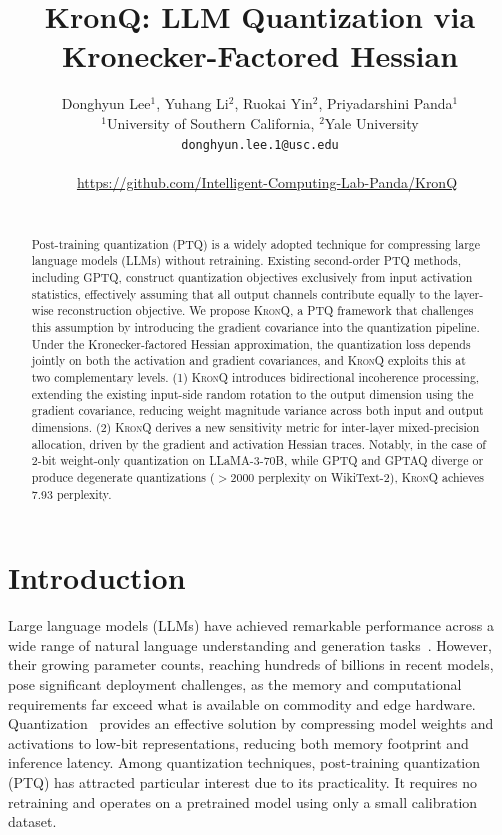 \documentclass{article} %
\title{KronQ: LLM Quantization via Kronecker-Factored Hessian}
\author{Donghyun Lee$^1$, Yuhang Li$^2$, Ruokai Yin$^2$, Priyadarshini Panda$^1$ \\
$^1$University of Southern California, $^2$Yale University\\
\texttt{donghyun.lee.1@usc.edu}\\[0.8em]
\centerline{\raisebox{-0.15em}{\large\faGithub}~~\url{https://github.com/Intelligent-Computing-Lab-Panda/KronQ}}\\
}
\newcommand{\KronQ}{\textsc{KronQ}}
\begin{document}
\ifcolmsubmission
\linenumbers
\fi

\maketitle

\begin{abstract}
\vspace{-3mm}
Post-training quantization (PTQ) is a widely adopted technique for compressing large language models (LLMs) without retraining. Existing second-order PTQ methods, including GPTQ, construct quantization objectives exclusively from input activation statistics, effectively assuming that all output channels contribute equally to the layer-wise reconstruction objective. We propose \KronQ{}, a PTQ framework that challenges this assumption by introducing the gradient covariance into the quantization pipeline. Under the Kronecker-factored Hessian approximation, the quantization loss depends jointly on both the activation and gradient covariances, and \KronQ{} exploits this at two complementary levels. (1) \KronQ{} introduces bidirectional incoherence processing, extending the existing input-side random rotation to the output dimension using the gradient covariance, reducing weight magnitude variance across both input and output dimensions. (2) \KronQ{} derives a new sensitivity metric for inter-layer mixed-precision allocation, driven by the gradient and activation Hessian traces. Notably, in the case of 2-bit weight-only quantization on LLaMA-3-70B, while GPTQ and GPTAQ diverge or produce degenerate quantizations ($>$2000 perplexity on WikiText-2), \KronQ{} achieves 7.93 perplexity.
\end{abstract}


\section{Introduction}
\vspace{-3mm}
Large language models (LLMs) have achieved remarkable performance across a wide range of natural language understanding and generation tasks~\citep{brown2020language,touvron2023llama,grattafiori2024llama}. However, their growing parameter counts, reaching hundreds of billions in recent models, pose significant deployment challenges, as the memory and computational requirements far exceed what is available on commodity and edge hardware. Quantization~\citep{gholami2022survey, liang2021pruning} provides an effective solution by compressing model weights and activations to low-bit representations, reducing both memory footprint and inference latency. Among quantization techniques, post-training quantization (PTQ) has attracted particular interest due to its practicality. It requires no retraining and operates on a pretrained model using only a small calibration dataset.
\end{document}
